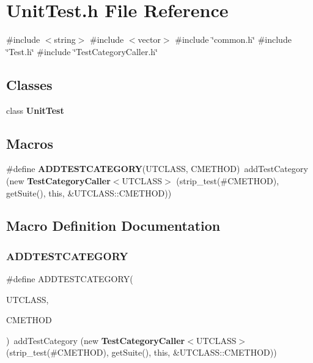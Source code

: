 \section{Unit\+Test.\+h File Reference}
\label{UnitTest_8h}
{\ttfamily \#include $<$string$>$}\newline
{\ttfamily \#include $<$vector$>$}\newline
{\ttfamily \#include \char`\"{}common.\+h\char`\"{}}\newline
{\ttfamily \#include \char`\"{}Test.\+h\char`\"{}}\newline
{\ttfamily \#include \char`\"{}Test\+Category\+Caller.\+h\char`\"{}}\newline
\subsection*{Classes}
\begin{DoxyCompactItemize}
\item 
class \textbf{ Unit\+Test}
\end{DoxyCompactItemize}
\subsection*{Macros}
\begin{DoxyCompactItemize}
\item 
\#define \textbf{ A\+D\+D\+T\+E\+S\+T\+C\+A\+T\+E\+G\+O\+RY}(U\+T\+C\+L\+A\+SS,  C\+M\+E\+T\+H\+OD)~add\+Test\+Category (new \textbf{ Test\+Category\+Caller}$<$U\+T\+C\+L\+A\+SS$>$ (strip\+\_\+test(\#C\+M\+E\+T\+H\+OD), get\+Suite(), this, \&U\+T\+C\+L\+A\+S\+S\+::\+C\+M\+E\+T\+H\+OD))
\end{DoxyCompactItemize}


\subsection{Macro Definition Documentation}
\mbox{\label{UnitTest_8h_a6f376d36fec734a0fec587ff31d5b324}} 
\subsubsection{A\+D\+D\+T\+E\+S\+T\+C\+A\+T\+E\+G\+O\+RY}
{\footnotesize\ttfamily \#define A\+D\+D\+T\+E\+S\+T\+C\+A\+T\+E\+G\+O\+RY(\begin{DoxyParamCaption}\item[{}]{U\+T\+C\+L\+A\+SS,  }\item[{}]{C\+M\+E\+T\+H\+OD }\end{DoxyParamCaption})~add\+Test\+Category (new \textbf{ Test\+Category\+Caller}$<$U\+T\+C\+L\+A\+SS$>$ (strip\+\_\+test(\#C\+M\+E\+T\+H\+OD), get\+Suite(), this, \&U\+T\+C\+L\+A\+S\+S\+::\+C\+M\+E\+T\+H\+OD))}

